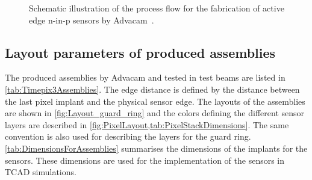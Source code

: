 \begin{figure}[htbp]
\begin{subfigure}[b]{0.3\textwidth}
    \caption{}
  \end{subfigure}

  \caption{Schematic illustration of the process flow for the
    fabrication of active edge n-in-p sensors by
    Advacam~\cite{AdvacamRef}.}
  \label{fig:AdvacamProcessFlow}
\end{figure}


\newpage
\subsection{Layout parameters of produced assemblies}
\label{sec:AEgeometry}

The produced assemblies by Advacam and tested in test beams are listed
in \cref{tab:Timepix3Assemblies}. The edge distance is defined by the
distance between the last pixel implant and the physical sensor
edge. The layouts of the assemblies are shown in
\cref{fig:Layout_guard_ring} and the colors defining the different
sensor layers are described in
\cref{fig:PixelLayout,tab:PixelStackDimensions}. The same convention
is also used for describing the layers for the guard
ring. \cref{tab:DimensionsForAssemblies} summarises the dimensions of
the implants for the sensors. These dimensions are used for the
implementation of the sensors in TCAD simulations.


